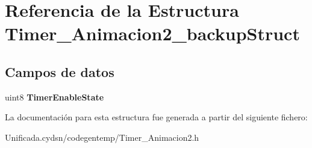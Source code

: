 \hypertarget{struct_timer___animacion2__backup_struct}{}\section{Referencia de la Estructura Timer\+\_\+\+Animacion2\+\_\+backup\+Struct}
\label{struct_timer___animacion2__backup_struct}
\subsection*{Campos de datos}
\begin{DoxyCompactItemize}
\item 
\mbox{\label{struct_timer___animacion2__backup_struct_a02d7a5264610dd17ede2bf5d1a8274cf}} 
uint8 {\bfseries Timer\+Enable\+State}
\end{DoxyCompactItemize}


La documentación para esta estructura fue generada a partir del siguiente fichero\+:\begin{DoxyCompactItemize}
\item 
Unificada.\+cydsn/codegentemp/Timer\+\_\+\+Animacion2.\+h\end{DoxyCompactItemize}
